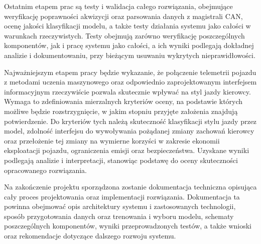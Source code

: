 Ostatnim etapem prac są testy i walidacja całego rozwiązania, obejmujące weryfikację
poprawności akwizycji oraz parsowania danych z magistrali CAN, ocenę jakości
klasyfikacji modelu, a także testy działania systemu jako całości w warunkach
rzeczywistych. Testy obejmują zarówno weryfikację poszczególnych komponentów,
jak i pracę systemu jako całości, a ich wyniki podlegają dokładnej analizie i
dokumentowaniu, przy bieżącym usuwaniu wykrytych nieprawidłowości.

Najważniejszym etapem pracy będzie wykazanie, że połączenie telemetrii pojazdu z
metodami uczenia maszynowego oraz odpowiednio zaprojektowanym interfejsem
informacyjnym rzeczywiście pozwala skutecznie wpływać na styl jazdy kierowcy.
Wymaga to zdefiniowania mierzalnych kryteriów oceny, na podstawie których możliwe
będzie rozstrzygnięcie, w jakim stopniu przyjęte założenia znajdują potwierdzenie. Do
kryteriów tych należą skuteczność klasyfikacji stylu jazdy przez model, zdolność
interfejsu do wywoływania pożądanej zmiany zachowań kierowcy oraz przełożenie tej
zmiany na wymierne korzyści w zakresie ekonomii eksploatacji pojazdu, ograniczenia
emisji oraz bezpieczeństwa. Uzyskane wyniki podlegają analizie i interpretacji,
stanowiąc podstawę do oceny skuteczności opracowanego rozwiązania.

Na zakończenie projektu sporządzona zostanie dokumentacja techniczna opisująca
cały proces projektowania oraz implementacji rozwiązania. Dokumentacja ta powinna
obejmować opis architektury systemu i zastosowanych technologii, sposób
przygotowania danych oraz trenowania i wyboru modelu, schematy poszczególnych
komponentów, wyniki przeprowadzonych testów, a także wnioski oraz rekomendacje
dotyczące dalszego rozwoju systemu.
